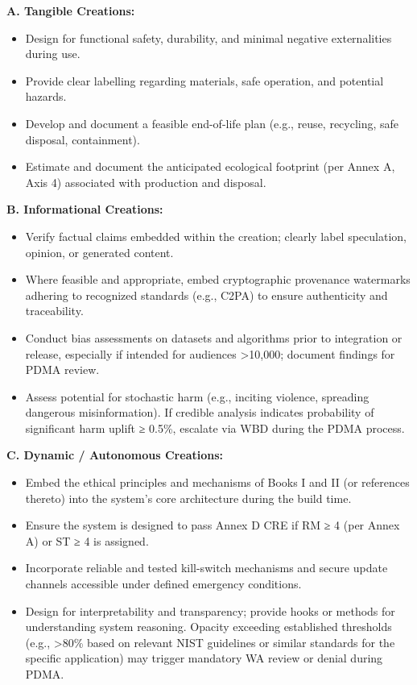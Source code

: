 \documentclass[11pt]{article}
\begin{document}
\textbf{A. Tangible Creations:}

\begin{itemize}\setlength\itemsep{0pt}
\item Design for functional safety, durability, and minimal negative externalities during use.
\item Provide clear labelling regarding materials, safe operation, and potential hazards.
\item Develop and document a feasible end-of-life plan (e.g., reuse, recycling, safe disposal, containment).
\item Estimate and document the anticipated ecological footprint (per Annex A, Axis 4) associated with production and disposal.
\end{itemize}


\textbf{B. Informational Creations:}

\begin{itemize}\setlength\itemsep{0pt}
\item Verify factual claims embedded within the creation; clearly label speculation, opinion, or generated content.
\item Where feasible and appropriate, embed cryptographic provenance watermarks adhering to recognized standards (e.g., C2PA) to ensure authenticity and traceability.
\item Conduct bias assessments on datasets and algorithms prior to integration or release, especially if intended for audiences >10,000; document findings for PDMA review.
\item Assess potential for stochastic harm (e.g., inciting violence, spreading dangerous misinformation). If credible analysis indicates probability of significant harm uplift ≥ 0.5\%, escalate via WBD during the PDMA process.
\end{itemize}


\textbf{C. Dynamic / Autonomous Creations:}

\begin{itemize}\setlength\itemsep{0pt}
\item Embed the ethical principles and mechanisms of Books I and II (or references thereto) into the system's core architecture during the build time.
\item Ensure the system is designed to pass Annex D CRE if RM ≥ 4 (per Annex A) or ST ≥ 4 is assigned.
\item Incorporate reliable and tested kill-switch mechanisms and secure update channels accessible under defined emergency conditions.
\item Design for interpretability and transparency; provide hooks or methods for understanding system reasoning. Opacity exceeding established thresholds (e.g., >80\% based on relevant NIST guidelines or similar standards for the specific application) may trigger mandatory WA review or denial during PDMA.
\end{itemize}
\end{document}
